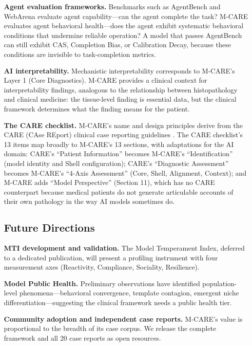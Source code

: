 \documentclass[11pt]{article}
\begin{document}
\textbf{Agent evaluation frameworks.} Benchmarks such as AgentBench \citep{Liu2023} and WebArena \citep{Zhou2023} evaluate agent capability---can the agent complete the task? M-CARE evaluates agent behavioral health---does the agent exhibit systematic behavioral conditions that undermine reliable operation? A model that passes AgentBench can still exhibit CAS, Completion Bias, or Calibration Decay, because these conditions are invisible to task-completion metrics.

\textbf{AI interpretability.} Mechanistic interpretability corresponds to M-CARE's Layer 1 (Core Diagnostics). M-CARE provides a clinical context for interpretability findings, analogous to the relationship between histopathology and clinical medicine: the tissue-level finding is essential data, but the clinical framework determines what the finding means for the patient.

\textbf{The CARE checklist.} M-CARE's name and design principles derive from the CARE (CAse REport) clinical case reporting guidelines \citep{Gagnier2013}. The CARE checklist's 13 items map broadly to M-CARE's 13 sections, with adaptations for the AI domain: CARE's ``Patient Information'' becomes M-CARE's ``Identification'' (model identity and Shell configuration); CARE's ``Diagnostic Assessment'' becomes M-CARE's ``4-Axis Assessment'' (Core, Shell, Alignment, Context); and M-CARE adds ``Model Perspective'' (Section 11), which has no CARE counterpart because medical patients do not generate articulable accounts of their own pathology in the way AI models sometimes do.

\subsection{Future Directions}

\textbf{MTI development and validation.} The Model Temperament Index, deferred to a dedicated publication, will present a profiling instrument with four measurement axes (Reactivity, Compliance, Sociality, Resilience).

\textbf{Model Public Health.} Preliminary observations have identified population-level phenomena---behavioral convergence, template contagion, emergent niche differentiation---suggesting the clinical framework needs a public health tier.

\textbf{Community adoption and independent case reports.} M-CARE's value is proportional to the breadth of its case corpus. We release the complete framework and all 20 case reports as open resources.
\end{document}
